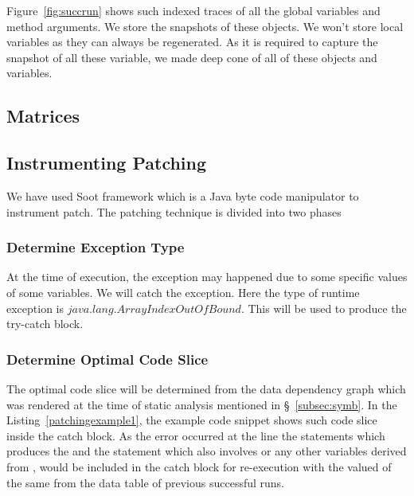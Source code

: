 Figure~\ref{fig:succrun} shows such indexed traces of all the global variables
and method arguments.
We store the snapshots of these objects. We won't store local variables as they
can always be regenerated.
As it is required to capture the snapshot of all these variable, we made deep
cone of all of these objects and variables.



\subsection{Matrices}
\label{subsec:martices}


\subsection{Instrumenting Patching}
\label{subsec:patchinstru}

We have used Soot framework which is a Java byte code manipulator to instrument
patch. 
The patching technique is divided into two phases

\subsubsection{Determine Exception Type} 

At the time of execution, the exception may happened due to some specific values
of some variables. We will catch the exception. Here the type of runtime
exception is $java.lang.ArrayIndexOutOfBound$. This will be used to produce the
try-catch block.
 
\subsubsection{Determine Optimal Code Slice}

The optimal code slice will be determined from the data dependency graph which
was rendered at the time of static analysis mentioned in
\S~\ref{subsec:symb}. In the Listing~\ref{patchingexample1}, the example
code snippet shows such code slice inside the catch block.
As the error occurred at the line  the
statements which produces the  and the statement which also involves
 or any other variables derived from , would be included
in the catch block for re-execution with the valued of the same from
the data table of previous successful runs.

